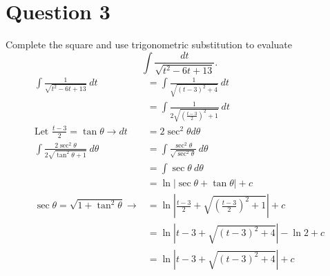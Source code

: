 \documentclass{article}
\begin{document}
\section*{Question 3}
Complete the square and use trigonometric substitution to evaluate
\[\int\frac{dt}{\sqrt{t^2-6t+13}}.\]
\begin{align*}
    \int\frac{1}{\sqrt{t^2-6t+13}}\:dt                        & =\int\frac{1}{\sqrt{(t-3)^2+4}}\:dt                    \\
                                                              & =\int\frac{1}{2\sqrt{(\frac{t-3}{2})^2+1}}\:dt         \\
    \text{Let }\frac{t-3}{2}=\tan\theta \rightarrow dt        & =2\sec^2\theta d\theta                                 \\
    \int\frac{2\sec^2\theta}{2\sqrt{\tan^2\theta+1}}\:d\theta & =\int\frac{\sec^2\theta}{\sqrt{\sec^2\theta}}\:d\theta \\
                                                              & =\int\sec\theta\:d\theta                               \\
                                                              & =\ln|\sec\theta+\tan\theta|+c                          \\
    \sec\theta = \sqrt{1+\tan^2\theta}\rightarrow             & =\ln|\frac{t-3}{2}+\sqrt{(\frac{t-3}{2})^2+1}|+c       \\
                                                              & = \ln|t-3+\sqrt{(t-3)^2+4}|-\ln2+c                     \\
                                                              & = \ln|t-3+\sqrt{(t-3)^2+4}|+c
\end{align*}
\end{document}
